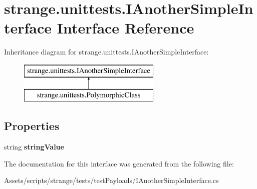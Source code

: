\hypertarget{interfacestrange_1_1unittests_1_1_i_another_simple_interface}{\section{strange.\-unittests.\-I\-Another\-Simple\-Interface Interface Reference}
\label{interfacestrange_1_1unittests_1_1_i_another_simple_interface}
}
Inheritance diagram for strange.\-unittests.\-I\-Another\-Simple\-Interface\-:\begin{figure}[H]
\begin{center}
\leavevmode
\includegraphics[height=2.000000cm]{interfacestrange_1_1unittests_1_1_i_another_simple_interface}
\end{center}
\end{figure}
\subsection*{Properties}
\begin{DoxyCompactItemize}
\item 
\hypertarget{interfacestrange_1_1unittests_1_1_i_another_simple_interface_a08b29aa9f4256fb486a1d6857af20503}{string {\bfseries string\-Value}}\label{interfacestrange_1_1unittests_1_1_i_another_simple_interface_a08b29aa9f4256fb486a1d6857af20503}

\end{DoxyCompactItemize}


The documentation for this interface was generated from the following file\-:\begin{DoxyCompactItemize}
\item 
Assets/scripts/strange/tests/test\-Payloads/I\-Another\-Simple\-Interface.\-cs\end{DoxyCompactItemize}
